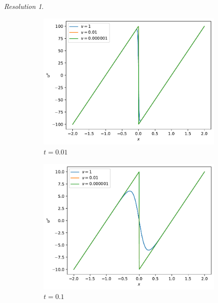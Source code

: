 \documentclass[10pt,a4paper]{article}
\theoremstyle{remark}
\newtheorem*{res}{Resolution}
\begin{document}
\begin{res}
\begin{enumerate}
          \begin{figure}[ht]
            \centering
            \begin{subfigure}{0.32\textwidth}
              \centering
              \includegraphics[width=\textwidth]{Images/burger_t=0.01.pdf}
              \caption{$t = 0.01$}
            \end{subfigure}
            \begin{subfigure}{0.32\textwidth}
              \centering
              \includegraphics[width=\textwidth]{Images/burger_t=0.1.pdf}
              \caption{$t = 0.1$}
            \end{subfigure}
            \begin{subfigure}{0.32\textwidth}
              \centering

\end{subfigure}
\end{figure}
\end{enumerate}
\end{res}
\end{document}
